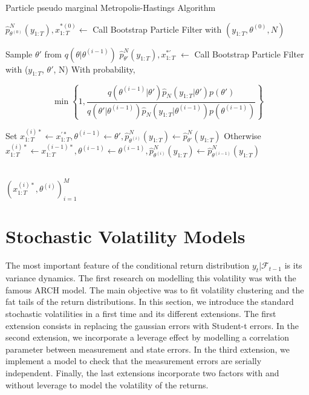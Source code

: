 \documentclass[11pt,a4,twosided,singlespacing,titlepagenumber=on]{scrreprt}
\numberwithin{equation}{chapter} %
\theoremstyle{remark}
\begin{document}
\begin{algorithm}[H]
\caption{Particle pseudo marginal Metropolis-Hastings Algorithm}\label{algo_pmcmc}
\begin{algorithmic}[1]

\State $\hat{p}^N_{\theta^{(0)}}(y_{1:T}), x^{*(0)}_{1:T} \gets$ Call Bootstrap Particle Filter with $(y_{1:T}, \theta^{(0)}, N)$

	\State Sample $\theta'$ from $q(\theta|\theta^{(i-1)})$
	\State $\hat{p}^N_{\theta'}(y_{1:T}), x^{*'}_{1:T}$ $ \gets$ Call Bootstrap Particle Filter with ($y_{1:T}$, $\theta'$, N)
	\State With probability,
	
	$$\min \left\{1, \frac{q(\theta^{(i-1)}|\theta')\hat{p}_N(y_{1:T}|\theta')p(\theta')}{q(\theta'|\theta^{(i-1)})\hat{p}_N(y_{1:T}|\theta^{(i-1)})p(\theta^{(i-1)})}  \right\} $$
	
	\State Set $x^{(i)*}_{1:T} \gets x^{'*}_{1:T},\theta^{(i-1)} \gets \theta', \hat{p}^N_{\theta^{(i)}}(y_{1:T}) \gets \hat{p}^N_{\theta'}(y_{1:T})$
	\State Otherwise $x^{(i)*}_{1:T} \gets x^{(i-1)*}_{1:T},\theta^{(i-1)} \gets \theta^{(i-1)}, \hat{p}^N_{\theta^{(i)}}(y_{1:T}) \gets \hat{p}^N_{\theta^{(i-1)}}(y_{1:T})$
	
\\
\EndProcedure
\Return $(x^{(i)*}_{1:T}, \theta^{(i)})_{i=1}^M$

\end{algorithmic}
\end{algorithm}

\chapter{Stochastic Volatility Models}
The most important feature of the conditional return distribution $y_t | \mathcal{F}_{t-1}$ is its variance dynamics. The first research on modelling this volatility was \cite{engle1982} with the famous ARCH model. The main objective was to fit volatility clustering and the fat tails of the return distributions. In this section, we introduce the standard stochastic volatilities in a first time and its different extensions. The first extension consists in replacing the gaussian errors with Student-t errors. In the second extension, we incorporate a leverage effect by modelling a correlation parameter between measurement and state errors. In the third extension, we implement a model to check that the measurement errors are serially independent. Finally, the last extensions incorporate two factors with and without leverage to model the volatility of the returns.
\end{document}
